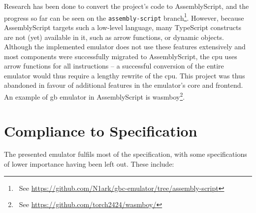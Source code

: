 \documentclass[11pt]{informatics-report}
\newcommand{\ftnt}[1]{\footnote{~See \url{#1}}}
\begin{document}
Research has been done to convert the project's code to AssemblyScript, and the progress so far can be seen on the \texttt{assembly-script} branch\ftnt{https://github.com/N1ark/gbc-emulator/tree/assembly-script}. However, because AssemblyScript targets such a low-level language, many TypeScript constructs are not (yet) available in it, such as arrow functions, or dynamic objects. Although the implemented emulator does not use these features extensively and most components were successfully migrated to AssemblyScript, the \gls{cpu} uses arrow functions for all instructions -- a successful conversion of the entire emulator would thus require a lengthy rewrite of the \gls{cpu}. This project was thus abandoned in favour of additional features in the emulator's core and frontend. An example of \gls{gb} emulator in AssemblyScript is wasmboy\ftnt{https://github.com/torch2424/wasmboy/}.

\section{Compliance to Specification}

The presented emulator fulfils most of the specification, with some specifications of lower importance having been left out. These include:
\end{document}
